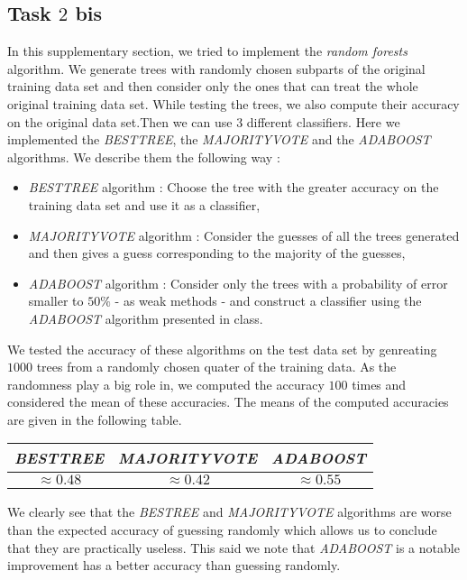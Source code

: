 \documentclass[french]{article}
\begin{document}
\subsection{Task $2$ bis}
	In this supplementary section, we tried to implement the \emph{random forests} algorithm. We generate trees with randomly chosen subparts of the original training data set and then consider only the ones that can treat the whole original training data set. While testing the trees, we also compute their accuracy on the original data set.Then we can use $3$ different classifiers. Here we implemented the \emph{BESTTREE}, the \emph{MAJORITYVOTE} and the \emph{ADABOOST} algorithms. We describe them the following way :
	\begin{itemize}
		\item \emph{BESTTREE} algorithm : Choose the tree with the greater accuracy on the training data set and use it as a classifier,
		\item \emph{MAJORITYVOTE} algorithm : Consider the guesses of all the trees generated and then gives a guess corresponding to the majority of the guesses,
		\item \emph{ADABOOST} algorithm : Consider only the trees with a probability of error smaller to $50\%$  - as weak methods - and construct a classifier using the \emph{ADABOOST} algorithm presented in class.
	\end{itemize}
	We tested the accuracy of these algorithms on the test data set by genreating $1000$ trees from a randomly chosen quater of the training data. As the randomness play a big role in, we computed the accuracy $100$ times and considered the mean of these accuracies. The means of the computed accuracies are given in the following table.
	\begin{center}
		\begin{tabular}{ |c|c|c| }
			\hline
			\emph{BESTTREE} & \emph{MAJORITYVOTE} & \emph{ADABOOST}\\
			\hline
			$\approx 0.48$ & $\approx 0.42$ & $\approx 0.55$\\
			\hline
		\end{tabular}
	\end{center}
	We clearly see that the \emph{BESTREE} and \emph{MAJORITYVOTE} algorithms are worse than the expected accuracy of guessing randomly which allows us to conclude that they are practically useless. This said we note that \emph{ADABOOST} is a notable improvement has a better accuracy than guessing randomly.
\end{document}
